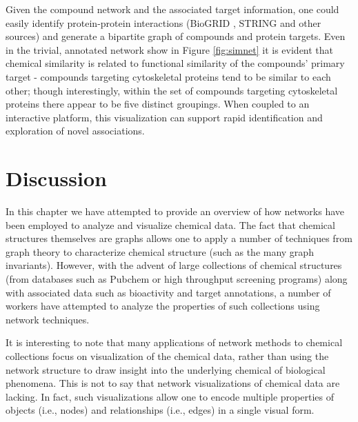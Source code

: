 \documentclass[]{book}
\newcommand{\rcdk}{\texttt{rcdk}\ }
\begin{document}
Given the compound network and the associated target information, one
could easily identify protein-protein interactions (BioGRID
\cite{Chatr-Aryamontri:2015yf}, STRING \cite{Franceschini:2013qa} and
other sources) and generate a bipartite graph of compounds and protein
targets. Even in the trivial, annotated network show in Figure
\ref{fig:simnet} it is evident that chemical similarity is related to
functional similarity of the compounds' primary target - compounds
targeting cytoskeletal proteins tend to be similar to each other;
though interestingly, within the set of compounds targeting
cytoskeletal proteins there appear to be five distinct groupings. When
coupled to an interactive platform, this visualization can support
rapid identification and exploration of novel associations.


\section{Discussion}
\label{sec:summary}

In this chapter we have attempted to provide an overview of how
networks have been employed to analyze and visualize chemical
data. The fact that chemical structures themselves are graphs allows
one to apply a number of techniques from graph theory to characterize
chemical structure (such as the many graph invariants). However, with
the advent of large collections of chemical structures (from databases
such as Pubchem or high throughput screening programs) along with
associated data such as bioactivity and target annotations, a number
of workers have attempted to analyze the properties of such
collections using network techniques.

It is interesting to note that many applications of network methods to
chemical collections focus on visualization of the chemical data,
rather than using the network structure to draw insight into the
underlying chemical of biological phenomena. This is not to say that
network visualizations of chemical data are lacking. In fact, such
visualizations allow one to encode multiple properties of objects
(i.e., nodes) and relationships (i.e., edges) in a single visual form. 
\end{document}
